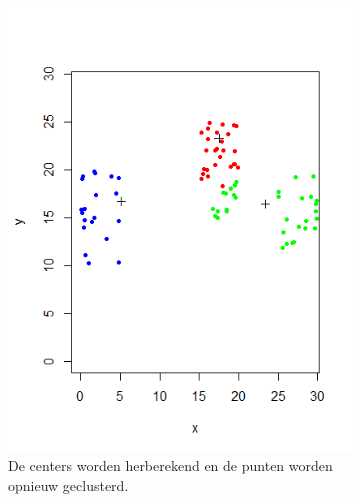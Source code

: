 \documentclass[a4paper,12pt]{article}
\theoremstyle{definition}
\begin{document}
\begin{figure}[!ht]
\begin{subfigure}[t]{0.3\textwidth}
        \includegraphics[width=\textwidth]{kmeans_it1.png}
        \caption{De centers worden herberekend en de punten worden opnieuw geclusterd.}
    \end{subfigure}
    \begin{subfigure}[t]{0.3\textwidth}

\end{subfigure}
\end{figure}
\end{document}
